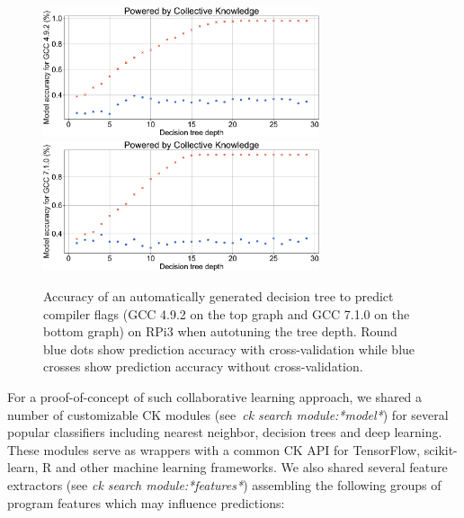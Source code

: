    \begin{figure}[!htbp]
     \centering
      \includegraphics[width=3.2in]
      {ck-assets/4d19bcd3cfe164ba-cropped.pdf} %
      \includegraphics[width=3.2in]
      {ck-assets/d2704b9bbf2441c8-cropped.pdf} %
     \caption{
      Accuracy of an automatically generated decision tree to predict compiler flags (GCC 4.9.2 on the top graph and GCC 7.1.0 on the bottom graph) 
      on RPi3 when autotuning the tree depth.
      Round blue dots show prediction accuracy with cross-validation while blue crosses show
      prediction accuracy without cross-validation.
     }
     \label{fig:ck-model-crowdtuning-gcc}
   \end{figure}

For a proof-of-concept of such collaborative learning approach, 
we shared a number of customizable CK modules (see~\emph{ck search module:*model*})
for several popular classifiers including nearest neighbor,
decision trees and deep learning.
%
These modules serve as wrappers with a common CK API for
TensorFlow, scikit-learn, R and other machine learning frameworks.
%
We also shared several feature extractors (see \emph{ck search module:*features*}) 
assembling the following groups of program features
which may influence predictions:

